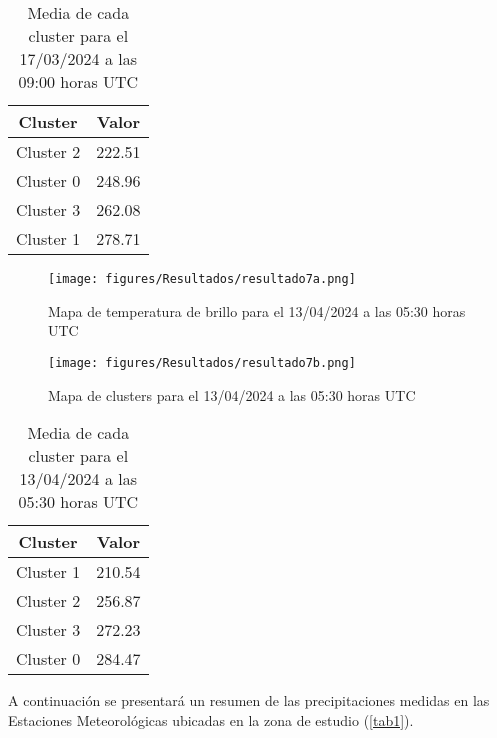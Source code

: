 \documentclass[twocolumn]{IECEjournal} %
\begin{document}
\begin{table}[h!]
    \centering
    \label{tab11}
    \begin{tabular}{|c|c|}
    \hline
    \textbf{Cluster} & \textbf{Valor} \\
    \hline
    Cluster 2 & 222.51 \\
    Cluster 0 & 248.96 \\
    Cluster 3 & 262.08 \\
    Cluster 1 & 278.71 \\
    \hline
    \end{tabular}
    \caption{Media de cada cluster para el 17/03/2024 a las 09:00 horas UTC}
\end{table}

\begin{figure}[H]
	\centering
	\texttt{[image: figures/Resultados/resultado7a.png]}
	\caption{Mapa de temperatura de brillo para el 13/04/2024 a las 05:30 horas UTC}
	\label{fig20}
\end{figure}

\begin{figure}[H]
	\centering
	\texttt{[image: figures/Resultados/resultado7b.png]}
	\caption{Mapa de clusters para el 13/04/2024 a las 05:30 horas UTC}
	\label{fig21}
\end{figure}

\begin{table}[h!]
    \centering
    \label{tab12}
    \begin{tabular}{|c|c|}
    \hline
    \textbf{Cluster} & \textbf{Valor} \\
    \hline
    Cluster 1 & 210.54 \\
    Cluster 2 & 256.87 \\
    Cluster 3 & 272.23 \\
    Cluster 0 & 284.47 \\
    \hline
    \end{tabular}
    \caption{Media de cada cluster para el 13/04/2024 a las 05:30 horas UTC}
\end{table}


A continuación se presentará un resumen de las precipitaciones medidas en las Estaciones Meteorológicas ubicadas en la zona de estudio (\ref{tab1}).
\end{document}
